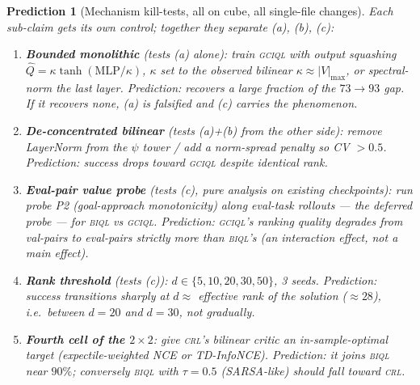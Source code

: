 \documentclass[10pt]{article}
\newtheorem{prediction}{Prediction}
\begin{document}
\begin{prediction}[Mechanism kill-tests, all on cube, all single-file changes]\label{pred:mech}
Each sub-claim gets its own control; together they separate (a), (b), (c):
\begin{enumerate}
\item \textbf{Bounded monolithic} (tests (a) alone): train \textsc{gciql} with output
squashing $\hat Q=\kappa\tanh(\mathrm{MLP}/\kappa)$, $\kappa$ set to the observed bilinear
$\kappa\approx|V|_{\max}$, or spectral-norm the last layer. Prediction: recovers a large
fraction of the $73\to93$ gap. If it recovers \emph{none}, (a) is falsified and (c) carries
the phenomenon.
\item \textbf{De-concentrated bilinear} (tests (a)+(b) from the other side): remove
LayerNorm from the $\psi$ tower / add a norm-spread penalty so CV $>0.5$. Prediction:
success drops toward \textsc{gciql} despite identical rank.
\item \textbf{Eval-pair value probe} (tests (c), pure analysis on existing checkpoints):
run probe P2 (goal-approach monotonicity) along \emph{eval-task} rollouts --- the deferred
probe --- for \textsc{biql} vs \textsc{gciql}. Prediction: \textsc{gciql}'s ranking quality
degrades from val-pairs to eval-pairs strictly more than \textsc{biql}'s (an interaction
effect, not a main effect).
\item \textbf{Rank threshold} (tests (c)): $d\in\{5,10,20,30,50\}$, 3 seeds. Prediction:
success transitions sharply at $d\approx$ effective rank of the solution ($\approx28$),
i.e.\ between $d{=}20$ and $d{=}30$, not gradually.
\item \textbf{Fourth cell of the $2\times2$}: give \textsc{crl}'s bilinear critic an
in-sample-optimal target (expectile-weighted NCE or TD-InfoNCE). Prediction: it joins
\textsc{biql} near $90\%$; conversely \textsc{biql} with $\tau=0.5$ (SARSA-like) should
fall toward \textsc{crl}.
\end{enumerate}
\end{prediction}
\end{document}
